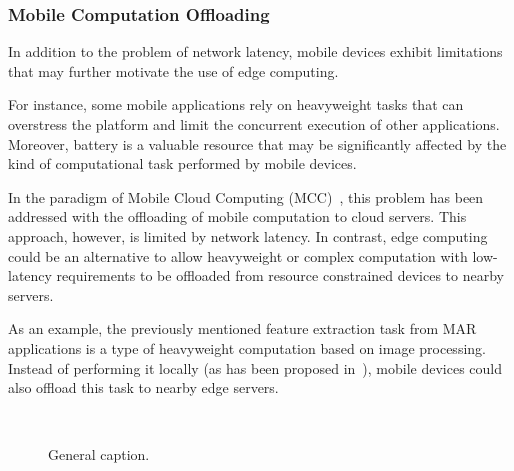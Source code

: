 \subsubsection{Mobile Computation Offloading}

In addition to the problem of network latency, mobile devices exhibit limitations that may further motivate the use of edge computing. 

For instance, some mobile applications rely on heavyweight tasks that can overstress the platform and limit the concurrent execution of other applications. Moreover, battery is a valuable resource that may be significantly affected by the kind of computational task performed by mobile devices. 

In the paradigm of Mobile Cloud Computing (MCC)~\cite{}, this problem has been addressed with the offloading of mobile computation to cloud servers. This approach, however, is limited by network latency. In contrast, edge computing could be an alternative to allow heavyweight or complex computation with low-latency requirements to be offloaded from resource constrained devices to nearby servers.


As an example, the previously mentioned feature extraction task from MAR applications is a type of heavyweight computation based on image processing. Instead of performing it locally (as has been proposed in~\cite{}), mobile devices could also offload this task to nearby edge servers. 

\begin{figure}[htbp]
	\centering
	\hfill
	~
	\hfill
	\caption{General caption.} \label{fig:1}
\end{figure}

